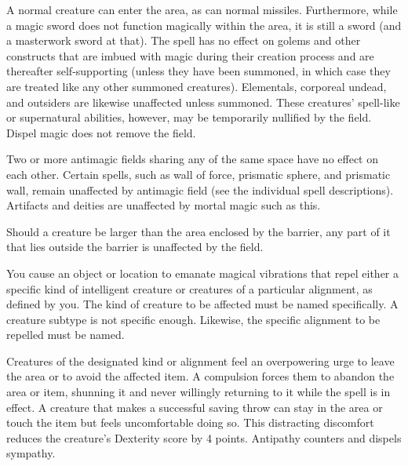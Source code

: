 \begin{multicols}{2}
\begin{small}
\smallskip\noindent A normal creature can enter the area, as can normal missiles. Furthermore, while a magic sword does not function magically within the area, it is still a sword (and a masterwork sword at that). The spell has no effect on golems and other constructs that are imbued with magic during their creation process and are thereafter self-supporting (unless they have been summoned, in which case they are treated like any other summoned creatures). Elementals, corporeal undead, and outsiders are likewise unaffected unless summoned. These creatures' spell-like or supernatural abilities, however, may be temporarily nullified by the field. Dispel magic does not remove the field.

\smallskip\noindent Two or more antimagic fields sharing any of the same space have no effect on each other. Certain spells, such as wall of force, prismatic sphere, and prismatic wall, remain unaffected by antimagic field (see the individual spell descriptions). Artifacts and deities are unaffected by mortal magic such as this. 

\smallskip\noindent Should a creature be larger than the area enclosed by the barrier, any part of it that lies outside the barrier is unaffected by the field.


\noindent You cause an object or location to emanate magical vibrations that repel either a specific kind of intelligent creature or creatures of a particular alignment, as defined by you. The kind of creature to be affected must be named specifically. A creature subtype is not specific enough. Likewise, the specific alignment to be repelled must be named.

\smallskip\noindent Creatures of the designated kind or alignment feel an overpowering urge to leave the area or to avoid the affected item.
A compulsion forces them to abandon the area or item, shunning it and never willingly returning to it while the spell is in effect. A creature that makes a successful saving throw can stay in the area or touch the item but feels uncomfortable doing so. This distracting discomfort reduces the creature's Dexterity score by 4 points.
Antipathy counters and dispels sympathy.


\end{small}
\end{multicols}
